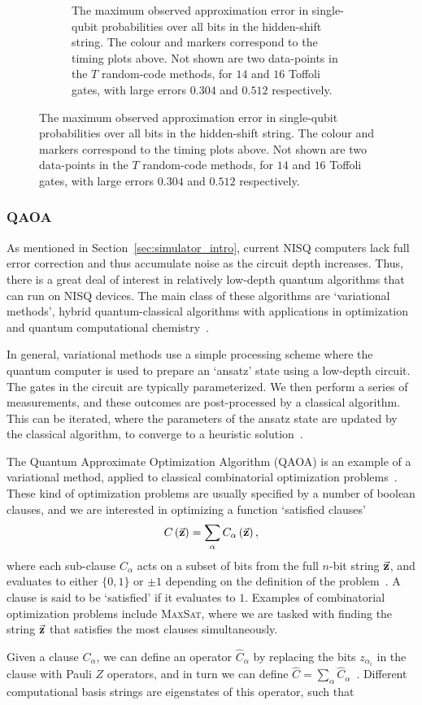 \begin{figure}[t]
\begin{subfigure}[t]{0.6\textwidth}
\caption{The maximum observed approximation error in single-qubit probabilities over all bits in the hidden-shift string. The colour and markers correspond to the timing plots above. Not shown are two data-points in the $T$ random-code methods, for $14$ and $16$ Toffoli gates, with large errors $0.304$ and $0.512$ respectively.}
\end{subfigure}
\end{figure}
\subsubsection{QAOA}
As mentioned in Section~\ref{sec:simulator_intro}, current NISQ computers lack full error correction and thus accumulate noise as the circuit depth increases. Thus, there is a great deal of interest in relatively low-depth quantum algorithms that can run on NISQ devices. The main class of these algorithms are `variational methods', hybrid quantum-classical algorithms with applications in optimization and quantum computational chemistry~\cite{Moll2018}.\par
In general, variational methods use a simple processing scheme where the quantum computer is used to prepare an `ansatz' state using a low-depth circuit. The gates in the circuit are typically parameterized. We then perform a series of measurements, and these outcomes are post-processed by a classical algorithm. This can be iterated, where the parameters of the ansatz state are updated by the classical algorithm, to converge to a heuristic solution~\cite{Moll2018,Preskill2018}.\par
The Quantum Approximate Optimization Algorithm (QAOA) is an example of a variational method, applied to classical combinatorial optimization problems~\cite{Farhi2014}. These kind of optimization problems are usually specified by a number of boolean clauses, and we are interested in optimizing a function `satisfied clauses'
\[C\left(\va{z}\right) = \sum_{\alpha} C_{\alpha}\left(\va{z}\right),\]
where each sub-clause $C_{\alpha}$ acts on a subset of bits from the full $n$-bit string $\va{z}$, and evaluates to either $\{0,1\}$ or $\pm 1$ depending on the definition of the problem~\cite{Farhi2014}. A clause is said to be `satisfied' if it evaluates to $1$. Examples of combinatorial optimization problems include \textsc{MaxSat}, where we are tasked with finding the string $\va{z}$ that satisfies the most clauses simultaneously.\par
Given a clause $C_{\alpha}$, we can define an operator $\hat{C}_{\alpha}$ by replacing the bits $z_{\alpha_{i}}$ in the clause with Pauli $Z$ operators, and in turn we can define $\hat{C}=\sum_{\alpha}\hat{C}_{\alpha}$~\cite{Farhi2014}. Different computational basis strings are eigenstates of this operator, such that 
